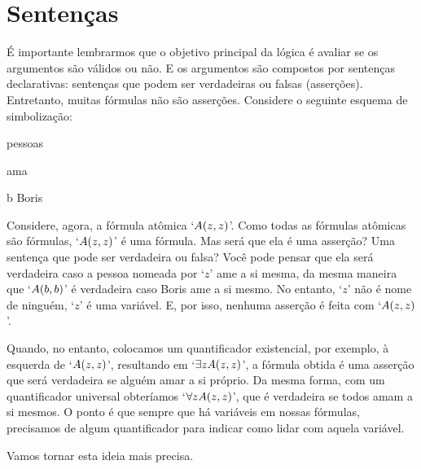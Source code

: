 \section{Sentenças}
É importante lembrarmos que o objetivo principal da lógica é avaliar se os argumentos são válidos ou não.
E os argumentos são compostos por sentenças declarativas:
sentenças que podem ser verdadeiras ou falsas (asserções).
Entretanto, muitas fórmulas não são asserções.
Considere o seguinte esquema de simbolização:
\begin{center}
	\begin{ekey}
		\item[\text{domínio}] pessoas
		\item[\atom{A}{x,y}]  ama 
		\item[b] Boris
	\end{ekey}
\end{center}
Considere, agora, a fórmula atômica `$\mathord{A}(z,z)$'.
Como todas as fórmulas atômicas são fórmulas, `$\mathord{A}(z,z)$' é uma fórmula. Mas será que ela é uma asserção? Uma sentença que pode ser verdadeira ou falsa?
Você pode pensar que ela será verdadeira caso a pessoa nomeada por `$z$' ame a si mesma, da mesma maneira que `$\mathord{A}(b,b)$' é verdadeira caso Boris ame a si mesmo.
No entanto, `$z$' não é nome de ninguém, `$z$' é uma variável.
E, por isso, nenhuma asserção é feita com `$\mathord{A}(z,z)$'.

Quando, no entanto, colocamos um quantificador existencial, por exemplo, à esquerda de `$\mathord{A}(z,z)$', resultando em `$\exists z \mathord{A}(z,z)$', a fórmula obtida é uma asserção  que será verdadeira se alguém amar a si próprio.
Da mesma forma, com um quantificador universal obteríamos `$\forall z \mathord{A}(z,z)$', que é verdadeira se todos amam a si mesmos.
O ponto é que sempre que há variáveis em nossas fórmulas, precisamos de algum quantificador para indicar como lidar com aquela variável.

Vamos tornar esta ideia mais precisa.


